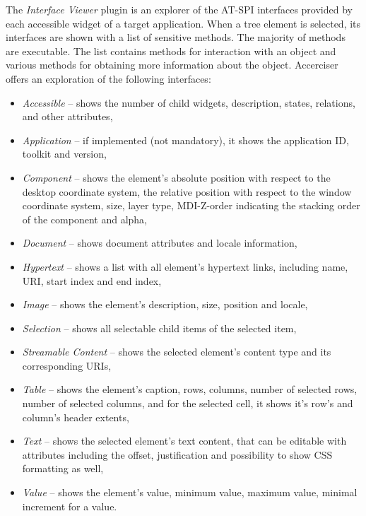 The \textit{Interface Viewer} plugin is an explorer of the AT-SPI interfaces provided by each accessible widget of a target application. When a tree element is selected, its interfaces are shown with a list of sensitive methods. The majority of methods are executable. The list contains methods for interaction with an object and various methods for obtaining more information about the object. Accerciser offers an exploration of the following interfaces:
\begin{itemize}
    \item \emph{Accessible} -- shows the number of child widgets, description, states, relations, and other attributes,
    \item \emph{Application} -- if implemented (not mandatory), it shows the application ID, toolkit and version,
    \item \emph{Component} -- shows the element's absolute position with respect to the desktop coordinate system, the relative position with respect to the  window coordinate system, size, layer type, MDI-Z-order indicating the stacking order of the component and alpha,
    \item \emph{Document} -- shows document attributes and locale information,
    \item \emph{Hypertext} -- shows a list with all element's hypertext links,  including name, URI, start index and end index,
    \item \emph{Image} -- shows the element's description, size, position and locale,
    \item \emph{Selection} -- shows all selectable child items of the selected item,
    \item \emph{Streamable Content} -- shows the selected element's content type and its corresponding URIs,
    \item \emph{Table} -- shows the element's caption, rows, columns, number of selected rows, number of selected columns, and for the selected cell, it shows  it's row's and column's header extents,
    \item \emph{Text} -- shows the selected element's text content, that can be editable with attributes including the offset, justification  and possibility to show CSS formatting as well,
    \item \emph{Value} -- shows the element's value, minimum value, maximum value, minimal increment for a value.
\end{itemize}

